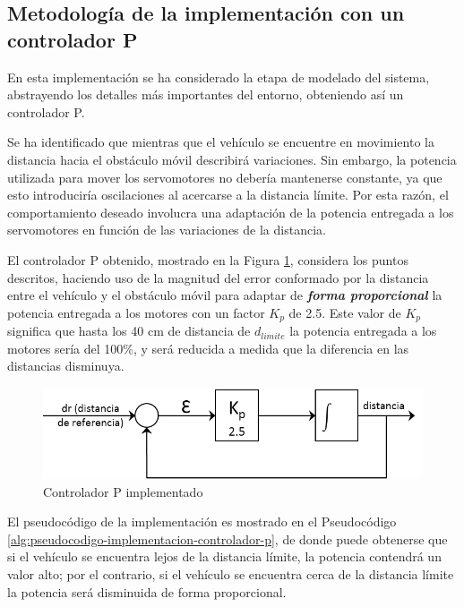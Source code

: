 \documentclass[journal]{IEEEtran}
\begin{document}
\subsection{Metodología de la implementación con un controlador P}
\label{sub:metodologia-implementacion-controlador-p}
En esta implementación se ha considerado la etapa de modelado del sistema, abstrayendo los detalles más importantes del entorno, obteniendo así un controlador P.

Se ha identificado que mientras que el vehículo se encuentre en movimiento la distancia hacia el obstáculo móvil describirá variaciones.
Sin embargo, la potencia utilizada para mover los servomotores no debería mantenerse constante, ya que esto introduciría oscilaciones al acercarse a la distancia límite.
Por esta razón, el comportamiento deseado involucra una adaptación de la potencia entregada a los servomotores en función de las variaciones de la distancia.

El controlador P obtenido, mostrado en la Figura \ref{fig:controlador-p-implementado}, considera los puntos descritos, haciendo uso de la magnitud del error conformado por la distancia entre el vehículo y el obstáculo móvil para adaptar de \emph{\textbf{forma proporcional}} la potencia entregada a los motores con un factor $K_p$ de 2.5. Este valor de $K_{p}$ significa que hasta los 40 cm de distancia de $d_{limite}$ la potencia entregada a los motores sería del 100\%, y será reducida a medida que la diferencia en las distancias disminuya.

\begin{figure}[!t]
\centering
\includegraphics[width=\columnwidth]{diagramas/diagrama-controlador-p}
\caption{Controlador P implementado}
\label{fig:controlador-p-implementado}
\end{figure}

El pseudocódigo de la implementación es mostrado en el Pseudocódigo \ref{alg:pseudocodigo-implementacion-controlador-p}, de donde puede obtenerse que si el vehículo se encuentra lejos de la distancia límite, la potencia contendrá un valor alto; por el contrario, si el vehículo se encuentra cerca de la distancia límite la potencia será disminuida de forma proporcional.
\end{document}
